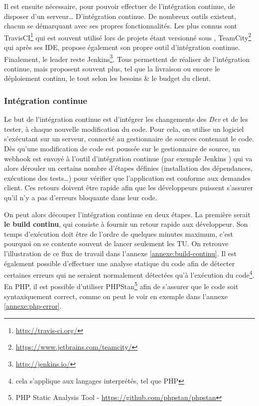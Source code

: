 
Il est ensuite nécessaire, pour pouvoir effectuer de l'intégration continue, de disposer d'un serveur\ldots{} D'intégration continue. De nombreux outils existent, chacun se démarquant avec ses propres fonctionnalités. Les plus connus sont TravisCI\footnote{\url{http://travis-ci.org/}} qui est souvent utilisé lors de projets étant versionné sous \github, TeamCity\footnote{\url{https://www.jetbrains.com/teamcity/}} qui après ses \gls{IDE}, propose également son propre outil d'intégration continue. Finalement, le leader reste Jenkins\footnote{\url{http://jenkins.io/}}. Tous permettent de réaliser de l'intégration continue, mais proposent souvent plus, tel que la livraison ou encore le déploiement continu, le tout selon les besoins \& le budget du client.

\subsubsection{Intégration continue}

Le but de l'intégration continue est d'intégrer les changements des \emph{Dev} et de les tester, à chaque nouvelle modification du code. Pour cela, on utilise un logiciel s'exécutant sur un serveur, connecté au gestionnaire de sources contenant le code. Dès qu'une modification de code est poussée sur le gestionnaire de source, un \gls{webhook} est envoyé à l'outil d'intégration continue (par exemple Jenkins \cite{jenkins-guide}) qui va alors dérouler un certains nombre d'étapes définies (installation des dépendances, exécutions des tests\ldots) pour vérifier que l'application est conforme aux demandes client. Ces retours doivent être rapide afin que les développeurs puissent s'assurer qu'il n'y a pas d'erreurs bloquante dans leur code.

On peut alors découper l'intégration continue en deux étapes. La première serait \textbf{le build continu}, qui consiste à fournir un retour rapide aux développeur. Son temps d'exécution doit être de l'ordre de quelques minutes maximum, c'est pourquoi on se contente souvent de lancer seulement les \gls{TU}. On retrouve l'illustration de ce flux de travail dans l'annexe \ref{annexe:build-continu}. Il est également possible d'effectuer une analyse statique du code afin de détecter certaines erreurs qui ne seraient normalement détectées qu'à l'exécution du code\footnote{cela s'applique aux langages interprétés, tel que \gls{PHP}}. En \gls{PHP}, il est possible d'utiliser PHPStan\footnote{PHP Static Analysis Tool - \url{https://github.com/phpstan/phpstan}} afin de s'assurer que le code soit syntaxiquement correct, comme on peut le voir en exemple dans l'annexe \ref{annexe:php-error}.

